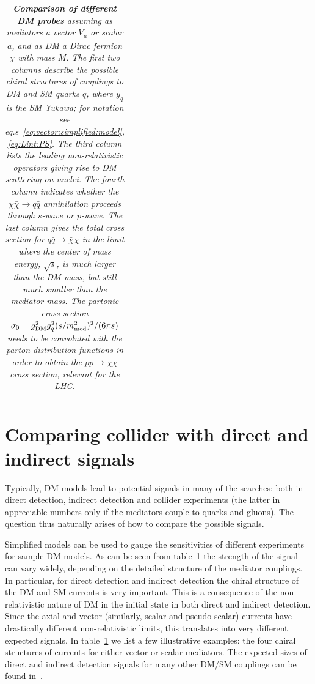 \begin{table}[t]
\begin{center}
{\begin{tabular}{lcccccc}
\end{tabular}
}
\end{center}
\vspace{-1ex}
\caption[Comparisons of DM production and annihilation cross sections]{\em\label{tab:different:DMint} {\bfseries Comparison of different DM probes} assuming 
as mediators a vector $V_\mu$ or scalar $a$,
and as DM a Dirac fermion $\chi$ with mass $M$.
The first two columns describe the possible chiral structures of couplings to DM and SM quarks $q$, where
$y_q$ is the SM Yukawa; for notation see eq.s~\eqref{eq:vector:simplified:model}, \eqref{eq:Lint:PS}.
The third column lists the leading non-relativistic operators giving rise to DM scattering on nuclei. 
The fourth column indicates whether the $\chi\bar \chi \to q\bar q$ annihilation proceeds through $s$-wave or $p$-wave. 
The last column gives the total cross section for $q\bar q \to \bar \chi \chi$ in the limit where the center of mass energy, $\sqrt s$, is much larger than the DM mass, but still much smaller than the mediator mass. 
The partonic cross section $\sigma_0=g_{\rm DM}^2 g_q^2 (s/m_{\rm med}^2)^2 /(6\pi s)$ needs to be convoluted with the parton distribution functions in order to obtain the $pp\to \chi \chi$ cross section, relevant for the LHC.
}
\end{table}


\section{Comparing collider with direct and indirect signals}
\label{sec:complementarities}
Typically,  DM models lead to potential signals in many of the searches: both in direct detection, indirect detection and collider experiments (the latter in appreciable numbers only if the mediators couple to quarks and gluons). The question thus naturally arises of how to compare the possible signals. 

Simplified models can be used to gauge the sensitivities of different experiments for sample DM models. As can be seen from table~\ref{tab:different:DMint} the strength of the signal can vary widely, depending on the detailed structure of the mediator couplings. In particular, for direct detection and indirect detection the chiral structure of the DM and SM currents is very important. This is a consequence of the non-relativistic nature of DM in the initial state in both direct and indirect detection. Since the axial and vector (similarly, scalar and pseudo-scalar) currents have drastically different non-relativistic limits, this translates into very different expected signals. In table~\ref{tab:different:DMint} we list a few illustrative examples: the four chiral structures of currents for either vector or scalar mediators. The expected sizes of direct and indirect detection signals for many other DM/SM couplings can be found in~\cite{1305.1611}.


